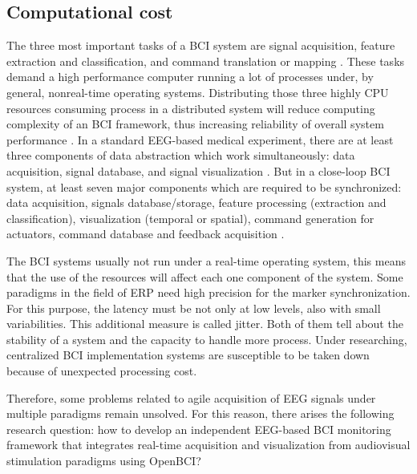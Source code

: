 \subsection{Computational cost}

The three most important tasks of a \gls*{BCI} system are signal acquisition, feature extraction and classification, and command translation or mapping \cite{sugiarto2009application}. These tasks demand a high performance computer running a lot of processes under, by general, nonreal-time operating systems. Distributing those three highly CPU resources consuming process in a distributed system will reduce computing complexity of an \gls*{BCI} framework, thus increasing reliability of overall system performance \cite{sugiarto2009application}. In a standard \gls*{EEG}-based medical experiment, there are at least three components of data abstraction which work simultaneously: data acquisition, signal database, and signal visualization \cite{alvarez2015clinical, beniczky2017standardized}. But in a close-loop \gls*{BCI} system, at least seven major components which are required to be synchronized: data acquisition, signals database/storage, feature processing (extraction and classification), visualization (temporal or spatial), command generation for actuators, command database and feedback acquisition \cite{sugiarto2009application}.

The \gls*{BCI} systems usually not run under a real-time operating system, this means that the use of the resources will affect each one component of the system. Some paradigms in the field of \gls*{ERP} need high precision for the marker synchronization. For this purpose, the latency must be not only at low levels, also with small variabilities. This additional measure is called jitter. Both of them tell about the stability of a system and the capacity to handle more process. Under researching, centralized \gls*{BCI} implementation systems are susceptible to be taken down because of unexpected processing cost. 

Therefore, some problems related to agile acquisition of \gls*{EEG} signals under multiple paradigms remain unsolved. For this reason, there arises the following research question: how to develop an independent \gls*{EEG}-based \gls*{BCI} monitoring framework that integrates real-time acquisition and visualization from audiovisual stimulation paradigms using OpenBCI?

